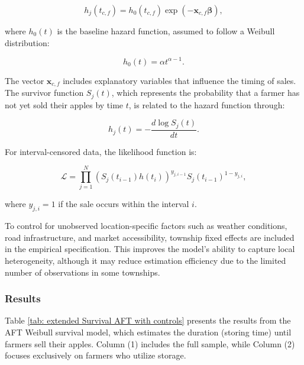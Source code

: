 \begin{equation}
    h_j(t_{c,f}) = h_0(t_{c,f}) \exp\left(-\mathbf{x}_{c,f} \boldsymbol{\beta}\right),
\end{equation}

where \(h_0(t)\) is the baseline hazard function, assumed to follow a Weibull distribution:

\begin{equation}
    h_0(t) = \alpha t^{\alpha-1}.
\end{equation}

The vector \(\mathbf{x}_{c,f}\) includes explanatory variables that influence the timing of sales. The survivor function \(S_j(t)\), which represents the probability that a farmer has not yet sold their apples by time \(t\), is related to the hazard function through:

\begin{equation}
    h_j(t) = -\frac{d \log S_j(t)}{dt}.
\end{equation}

For interval-censored data, the likelihood function is:

\begin{equation}
    \mathcal{L} = \prod_{j=1}^N \left(S_j(t_{i-1}) h(t_i)\right)^{y_{j,i-1}} S_j(t_{i-1})^{1-y_{j,i}},
\end{equation}

where \(y_{j,i} = 1\) if the sale occurs within the interval \(i\).

To control for unobserved location-specific factors such as weather conditions, road infrastructure, and market accessibility, township fixed effects are included in the empirical specification. This improves the model's ability to capture local heterogeneity, although it may reduce estimation efficiency due to the limited number of observations in some townships.



\subsubsection{Results}
\noindent 
Table \ref{tab: extended Survival AFT with controls} presents the results from the AFT Weibull survival model, which estimates the duration (storing time) until farmers sell their apples. Column (1) includes the full sample, while Column (2) focuses exclusively on farmers who utilize storage.

